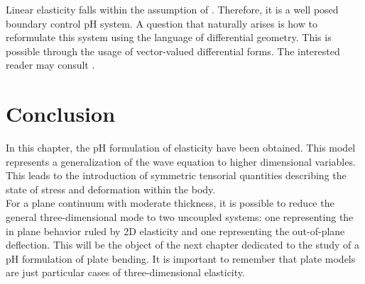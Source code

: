 Linear elasticity falls within the assumption of \cite{skrepek2019wellposedness}. Therefore, it is a well posed boundary control pH system. A question that naturally arises is how to reformulate this system using the language of differential geometry. This is possible through the usage of vector-valued differential forms. The interested reader may consult \cite{brezzi2008mixed}.

\section{Conclusion}
In this chapter, the pH formulation of elasticity have been obtained. This model represents a generalization of the wave equation to higher dimensional variables. This leads to the introduction of symmetric tensorial quantities describing the state of stress and deformation within the body. \\
For a plane continuum with moderate thickness, it is possible to
reduce the general three-dimensional mode to two uncoupled systems: one representing the in plane behavior ruled by 2D elasticity and one representing the out-of-plane deflection. This will be the object of the next chapter dedicated to the study of a pH formulation of plate bending. It is important to remember that plate models are just particular cases of three-dimensional elasticity.



